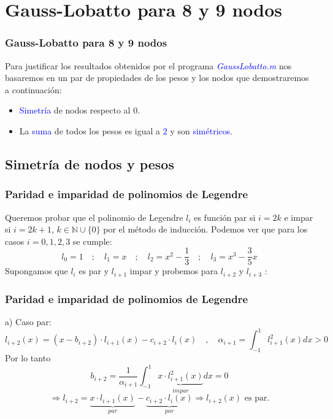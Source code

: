 \documentclass{beamer}
\begin{document}
\section{Gauss-Lobatto para 8 y 9 nodos}
\begin{frame}
\frametitle{Gauss-Lobatto para 8 y 9 nodos}
Para justificar los resultados obtenidos por el programa \textcolor{blue}{\textit{GaussLobatto.m}} nos basaremos en un par de propiedades de los pesos y los nodos que demostraremos a continuación:
\begin{itemize}
    \item \textcolor{blue}{Simetría} de nodos respecto al 0.
    \item La \textcolor{blue}{suma} de todos los pesos es igual a \textcolor{blue}{$2$} y son \textcolor{blue}{simétricos}.
\end{itemize}
\end{frame}


\subsection{Simetría de nodos y pesos}
\begin{frame}
\frametitle{Paridad e imparidad de polinomios de Legendre}
Queremos probar que el polinomio de Legendre $l_i$ es función par si $i=2k$ e impar si $i=2k+1$, $k\in\mathbb{N}\cup\{0\}$ por el método de inducción. Podemos ver que para los casos $i=0, 1, 2, 3$ se cumple:
\[l_0=1\quad;\quad l_1=x\quad;\quad l_2=x^2-\frac{1}{3}\quad;\quad l_3=x^3-\frac{3}{5}x \]
Supongamos que $l_i$ es par y $l_{i+1}$ impar y probemos para $l_{i+2}$ y $l_{i+3}$ :
\end{frame}


\begin{frame}
\frametitle{Paridad e imparidad de polinomios de Legendre}
a) Caso par:
\[l_{i+2}(x)=(x-b_{i+2})\cdot l_{i+1}(x)-c_{i+2}\cdot l_i(x)\quad, \quad\alpha_{i+1}=\int_{-1}^1l_{i+1}^2(x)dx>0\]
Por lo tanto \[b_{i+2}=\frac{1}{\alpha_{i+1}} \int_{-1}^1\underbrace{x\cdot l_{i+1}^2(x)}_{impar}dx=0\]
\[\Rightarrow l_{i+2}=\underbrace{x\cdot l_{i+1}(x)}_{par}-\underbrace{c_{i+2}\cdot l_i(x)}_{par}\Rightarrow l_{i+2}(x)\text{ es par.} \]
\end{frame}
\end{document}
